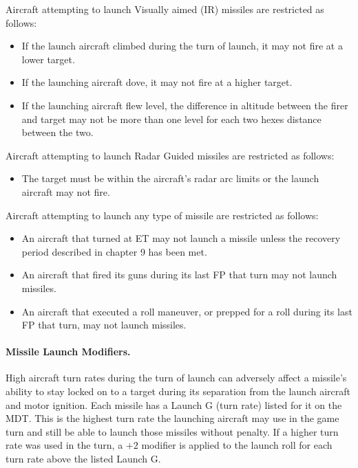 Aircraft attempting to launch Visually aimed (IR) missiles are restricted as follows:
 
\begin{itemize}

    \item If the launch aircraft climbed during the turn of launch, it may not fire at a lower target.

    \item If the launching aircraft dove, it may not fire at a higher target.

    \item If the launching aircraft flew level, the difference in altitude between the firer and target may not be more than one level for each two hexes distance between the two.

\end{itemize}

Aircraft attempting to launch Radar Guided missiles are restricted as follows:

\begin{itemize}

    \item The target must be within the aircraft's radar arc limits or the launch aircraft may not fire.

\end{itemize}

Aircraft attempting to launch any type of missile are restricted as follows:

\begin{itemize}

    \item An aircraft that turned at ET may not launch a missile unless the recovery period described in chapter 9 has been met.

    \item An aircraft that fired its guns during its last FP that turn may not launch missiles.

    \item An aircraft that executed a roll maneuver, or prepped for a roll during its last FP that turn, may not launch missiles.
    
\end{itemize}

\paragraph{Missile Launch Modifiers.} High aircraft turn rates during the turn of launch can adversely affect a missile's ability to stay locked on to a target during its separation from the launch aircraft and motor ignition. Each missile has a Launch G (turn rate) listed for it on the MDT. This is the highest turn rate the launching aircraft may use in the game turn and still be able to launch those missiles without penalty. If a higher turn rate was used in the turn, a $+2$ modifier is applied to the launch roll for each turn rate above the listed Launch G.

